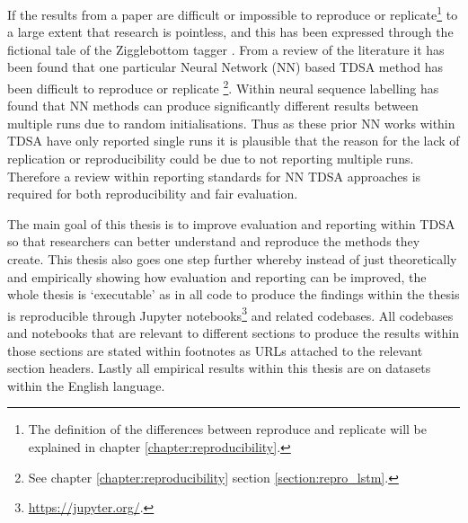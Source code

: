 If the results from a paper are difficult or impossible to reproduce or replicate\footnote{The definition of the differences between reproduce and replicate will be explained in chapter \ref{chapter:reproducibility}.} to a large extent that research is pointless, and this has been expressed through the fictional tale of the Zigglebottom tagger \citep{pedersen-2008-last}. From a review of the literature it has been found that one particular Neural Network (NN) based TDSA method has been difficult to reproduce or replicate \footnote{See chapter \ref{chapter:reproducibility} section \ref{section:repro_lstm}.}. Within neural sequence labelling \citet{reimers-gurevych-2017-reporting} has found that NN methods can produce significantly different results between multiple runs due to random initialisations. Thus as these prior NN works within TDSA have only reported single runs it is plausible that the reason for the lack of replication or reproducibility could be due to not reporting multiple runs. Therefore a review within reporting standards for NN TDSA approaches is required for both reproducibility and fair evaluation.

The main goal of this thesis is to improve evaluation and reporting within TDSA so that researchers can better understand and reproduce the methods they create. This thesis also goes one step further whereby instead of just theoretically and empirically showing how evaluation and reporting can be improved, the whole thesis is `executable' as in all code to produce the findings within the thesis is reproducible through Jupyter notebooks\footnote{\url{https://jupyter.org/}.} and related codebases. All codebases and notebooks that are relevant to different sections to produce the results within those sections are stated within footnotes as URLs attached to the relevant section headers. Lastly all empirical results within this thesis are on datasets within the English language.


